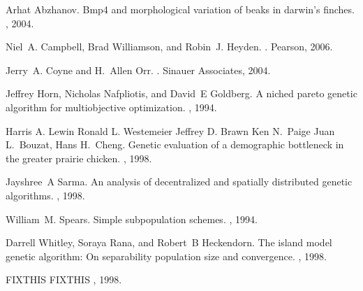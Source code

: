 \documentclass[conference]{IEEEtran}
\begin{document}

\begin{thebibliography}{1}

Arhat Abzhanov.
\newblock Bmp4 and morphological variation of beaks in darwin's finches.
, 2004.

Niel~A. Campbell, Brad Williamson, and Robin~J. Heyden.
.
\newblock Pearson, 2006.

Jerry~A. Coyne and H.~Allen Orr.
.
\newblock Sinauer Associates, 2004.

Jeffrey Horn, Nicholas Nafpliotis, and David~E Goldberg.
\newblock A niched pareto genetic algorithm for multiobjective optimization.
, 1994.

Harris A. Lewin Ronald L. Westemeier Jeffrey D. Brawn Ken N.~Paige Juan
  L.~Bouzat, Hans H.~Cheng.
\newblock Genetic evaluation of a demographic bottleneck in the greater prairie
  chicken.
, 1998.

Jayshree~A Sarma.
\newblock An analysis of decentralized and spatially distributed genetic
  algorithms.
, 1998.

William~M. Spears.
\newblock Simple subpopulation schemes.
, 1994.

Darrell Whitley, Soraya Rana, and Robert~B Heckendorn.
\newblock The island model genetic algorithm: On separability population size
  and convergence.
, 1998.

FIXTHIS
\newblock FIXTHIS
, 1998.

\end{thebibliography}







\end{document}
